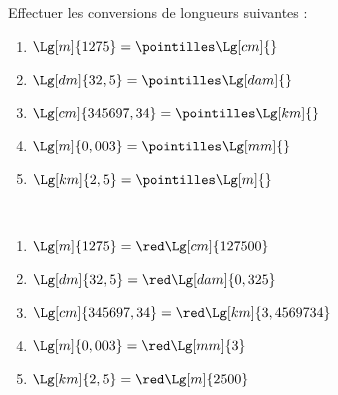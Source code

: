 \begin{exercice*} %
   Effectuer les conversions de longueurs suivantes :
   \begin{enumerate}
      \item $\Lg[m]{1275} =\pointilles \Lg[cm]{}$
      \item $\Lg[dm]{32,5} =\pointilles \Lg[dam]{}$
      \item $\Lg[cm]{345697,34} =\pointilles \Lg[km]{}$
      \item $\Lg[m]{0,003} =\pointilles \Lg[mm]{}$
      \item $\Lg[km]{2,5} =\pointilles \Lg[m]{}$
   \end{enumerate}
\end{exercice*}

\begin{corrige}
   \ \\ [-5mm]
   \begin{enumerate}
      \item $\Lg[m]{1275} =\red\Lg[cm]{127500}$
      \item $\Lg[dm]{32,5} =\red\Lg[dam]{0,325}$
      \item $\Lg[cm]{345697,34} =\red\Lg[km]{3,4569734}$
      \item $\Lg[m]{0,003} =\red\Lg[mm]{3}$
      \item $\Lg[km]{2,5} =\red\Lg[m]{2500}$
   \end{enumerate}
\end{corrige}

